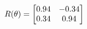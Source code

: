 \documentclass[preview]{standalone}
\begin{document}
\begin{align*}
\special{dvisvgm:raw <g id='unique000'>}R(\theta) = \begin{bmatrix}0.94 & -0.34\\0.34 & 0.94\end{bmatrix}\special{dvisvgm:raw </g>}
\end{align*}
\end{document}
